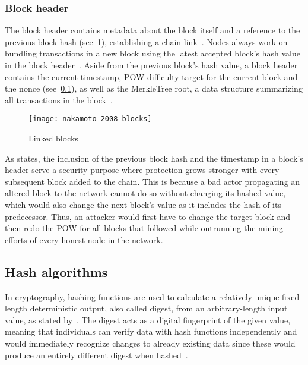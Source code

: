 \subsubsection{Block header}\label{subsubsec:block-header}

The block header contains metadata about the block itself and a reference to the previous block hash (see~\cref{fig:prev-block-hash}), establishing a chain link~\autocites[160]{antonopoulos_mastering_2017}[3]{nakamoto_bitcoin_2008}[15]{yaga_blockchain_2018}.
Nodes always work on bundling transactions in a new block using the latest accepted block's hash value in the block header~\autocite[3]{nakamoto_bitcoin_2008}.
Aside from the previous block's hash value, a block header contains the current timestamp, \gls{POW} difficulty target for the current block and the nonce (see~\cref{subsec:hash-algorithms}), as well as the \gls{MerkleTree} root, a data structure summarizing all transactions in the block~\autocites[160-161]{antonopoulos_mastering_2017}[15-16]{yaga_blockchain_2018}.

\begin{figure}[h]
    \caption{Linked blocks}
    \label{fig:prev-block-hash}
    \texttt{[image: nakamoto-2008-blocks]}
\end{figure}

As \textcite[2-3]{nakamoto_bitcoin_2008} states, the inclusion of the previous block hash and the timestamp in a block's header serve a security purpose where protection grows stronger with every subsequent block added to the chain.
This is because a bad actor propagating an altered block to the network cannot do so without changing its hashed value, which would also change the next block's value as it includes the hash of its predecessor.
Thus, an attacker would first have to change the target block and then redo the \gls{POW} for all blocks that followed while outrunning the mining efforts of every honest node in the network.

\subsection{Hash algorithms}\label{subsec:hash-algorithms}

In cryptography, hashing functions are used to calculate a relatively unique fixed-length deterministic output, also called digest, from an arbitrary-length input value, as stated by~\textcite[188]{antonopoulos_mastering_2017}.
The digest acts as a digital fingerprint of the given value, meaning that individuals can verify data with hash functions independently and would immediately recognize changes to already existing data since these would produce an entirely different digest when hashed~\autocites[188-189]{antonopoulos_mastering_2017}[7]{yaga_blockchain_2018}.

